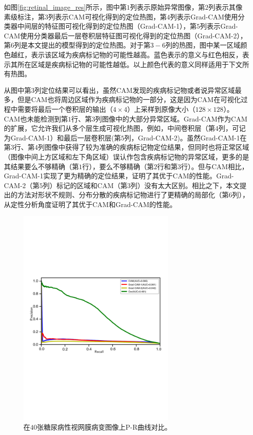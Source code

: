 如图\ref{fig:retinal_image_res}所示，图中第$1$列表示原始异常图像，第$2$列表示其像素级标注，第$3$列表示CAM可视化得到的定位热图，第$4$列表示Grad-CAM使用分类器中间层的特征图可视化得到的定位热图（Grad-CAM-1），第$5$列表示Grad-CAM使用分类器最后一层卷积层特征图可视化得到的定位热图（Grad-CAM-2），第$6$列是本文提出的模型得到的定位热图。对于第$3-6$列的热图，图中某一区域颜色越红，表示该区域为疾病标记物的可能性越高。蓝色表示的意义与红色相反，表示其所在区域是疾病标记物的可能性越低。以上颜色代表的意义同样适用于下文所有热图。

从图中第$3$列定位结果可以看出，虽然CAM发现的疾病标记物或者说异常区域最多，但是CAM也将周边区域作为疾病标记物的一部分，这是因为CAM在可视化过程中需要将最后一个卷积层的输出（$4\times 4$）上采样到原像大小（$128\times 128$）。CAM也未能检测到第$1$行、第$3$列图像中的大部分异常区域。Grad-CAM作为CAM的扩展，它允许我们从多个层生成可视化热图，例如，中间卷积层（第$4$列，可记为Grad-CAM-1）和最后一层卷积层(第$5$列，Grad-CAM-2)。虽然Grad-CAM-1在第$3$行、第$4$列图像中获得了较为准确的疾病标记物定位结果，但同时也将正常区域（图像中间上方区域和左下角区域）误认作包含疾病标记物的异常区域，更多的是其结果要么不够精确（第$1$行），要么不够精确（第$2$行和第$3$行）。但与CAM相比，Grad-CAM-1实现了更为精确的定位结果，证明了其优于CAM的性能。Grad-CAM-2（第$5$列）标记的区域和CAM（第$3$列）没有太大区别。相比之下，本文提出的方法对形状不规则、分布分散的疾病标记物进行了更精确的局部化（第$6$列），从定性分析角度证明了其优于CAM和Grad-CAM的性能。
\begin{figure}[h!]
	\centering
	\includegraphics[width=0.7\textwidth]{figure/pr_curve_retinal_image/pr_curve}
	\caption[在$40$张糖尿病性视网膜病变图像上P-R曲线对比]{在$40$张糖尿病性视网膜病变图像上P-R曲线对比。}
	\label{fig:retinal_image_pr_curve}
\end{figure}

